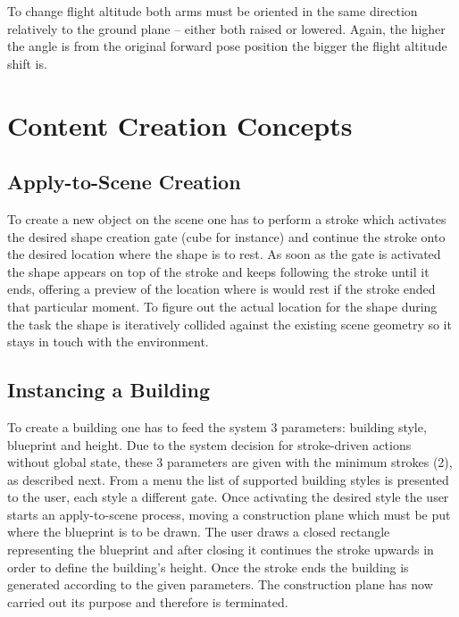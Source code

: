 To change flight altitude both arms must be oriented in the same direction relatively to the ground plane
-- either both raised or lowered. Again, the higher the angle is from the original forward pose position
the bigger the flight altitude shift is.



\section{Content Creation Concepts}

\subsection{Apply-to-Scene Creation}

To create a new object on the scene one has to perform a stroke which activates the desired shape creation gate (cube for instance)
and continue the stroke onto the desired location where the shape is to rest. As soon as the gate is activated the shape appears
on top of the stroke and keeps following the stroke until it ends, offering a preview of the location where is would rest
if the stroke ended that particular moment.
To figure out the actual location for the shape during the task the shape is iteratively collided against the
existing scene geometry so it stays in touch with the environment.



\subsection{Instancing a Building}

To create a building one has to feed the system 3 parameters: building style, blueprint and height.
Due to the system decision for stroke-driven actions without global state, these 3 parameters are given with the
minimum strokes (2), as described next.
From a menu the list of supported building styles is presented to the user, each style a different gate.
Once activating the desired style the user starts an apply-to-scene process, moving a construction plane which must
be put where the blueprint is to be drawn.
The user draws a closed rectangle representing the blueprint and after closing it continues
the stroke upwards in order to define the building's height.
Once the stroke ends the building is generated according to the given parameters.
The construction plane has now carried out its purpose and therefore is terminated.


